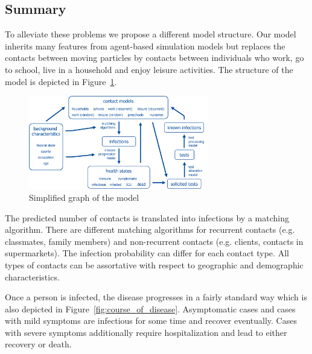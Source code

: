\subsection{Summary}
\label{sub:model_summary}

To alleviate these problems we propose a different model structure. Our model inherits many features from agent-based simulation models but replaces the contacts between moving particles by contacts between individuals who work, go to school, live in a household and enjoy leisure activities. The structure of the model is depicted in Figure~\ref{fig:model_graph}.

\begin{figure}[!ht]
    \centering
    \includegraphics[width=0.7\textwidth]{../figures/model_detailed.png}
    \caption{Simplified graph of the model}
    \label{fig:model_graph}
\end{figure}


The predicted number of contacts is translated into infections by a matching algorithm. There are different matching algorithms for recurrent contacts (e.g. classmates, family members) and non-recurrent contacts (e.g. clients, contacts in supermarkets). The infection probability can differ for each contact type. All types of contacts can be assortative with respect to geographic and demographic characteristics.

Once a person is infected, the disease progresses in a fairly standard way which is also depicted in Figure~\ref{fig:course_of_disease}. Asymptomatic cases and cases with mild symptoms are infectious for some time and recover eventually. Cases with severe symptoms additionally require hospitalization and lead to either recovery or death.

